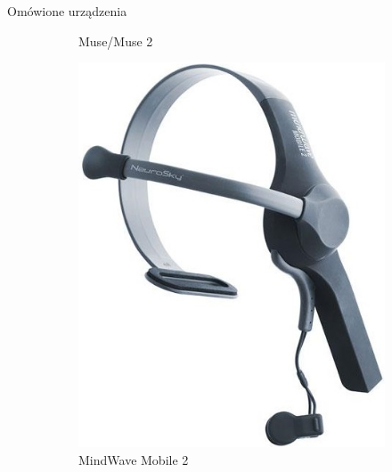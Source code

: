 \documentclass[10pt,aspectratio=169]{beamer}
\begin{document}
\begin{frame}{Omówione urządzenia}
\begin{figure}[htb]
\begin{subfigure}{0.2\linewidth}
    \caption{Muse/Muse 2}
    \end{subfigure}
    \par\bigskip
    \hspace*{\fill}\begin{subfigure}{0.2\linewidth}
    \includegraphics[width=\linewidth,keepaspectratio]{obrazy/mindwave}
    \caption{MindWave Mobile 2}
    \end{subfigure}\hspace*{\fill}
    \begin{subfigure}{0.2\linewidth}

\end{subfigure}
\end{figure}
\end{frame}
\end{document}
